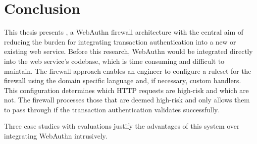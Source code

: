 
\chapter{Conclusion}\label{Chap:Conclusion}

This thesis presents \sys{}, a WebAuthn firewall architecture with the central aim of reducing the burden for integrating transaction authentication into a new or existing web service. Before this research, WebAuthn would be integrated directly into the web service's codebase, which is time consuming and difficult to maintain. The firewall approach enables an engineer to configure a ruleset for the firewall using the domain specific language and, if necessary, custom handlers. This configuration determines which HTTP requests are high-risk and which are not. The firewall processes those that are deemed high-risk and only allows them to pass through if the transaction authentication validates successfully.

Three case studies with evaluations justify the advantages of this system over integrating WebAuthn intrusively.

